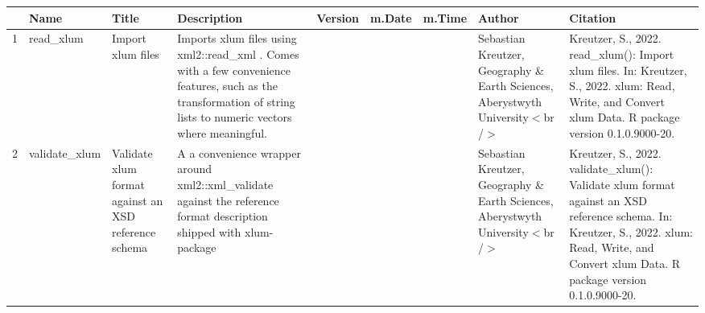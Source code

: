 \begin{table}[ht]
\centering
\begin{tabular}{rllllllll}
  \hline
 & Name & Title & Description & Version & m.Date & m.Time & Author & Citation \\ 
  \hline
1 & read\_xlum & Import xlum files & Imports xlum files using  xml2::read\_xml . Comes with a few convenience features, such as the transformation of string lists to numeric vectors where meaningful. &  &  &  & Sebastian Kreutzer, Geography \& Earth Sciences, Aberystwyth University$<$br /$>$ & Kreutzer, S., 2022. read\_xlum(): Import xlum files. In: Kreutzer, S., 2022. xlum: Read, Write, and Convert xlum Data. R package version 0.1.0.9000-20. 
 \\ 
  2 & validate\_xlum & Validate xlum format against an XSD reference schema & A a convenience wrapper around  xml2::xml\_validate  against the reference format description shipped with  xlum-package &  &  &  & Sebastian Kreutzer, Geography \& Earth Sciences, Aberystwyth University$<$br /$>$ & Kreutzer, S., 2022. validate\_xlum(): Validate xlum format against an XSD reference schema. In: Kreutzer, S., 2022. xlum: Read, Write, and Convert xlum Data. R package version 0.1.0.9000-20. 
 \\ 
   \hline
\end{tabular}
\end{table}

